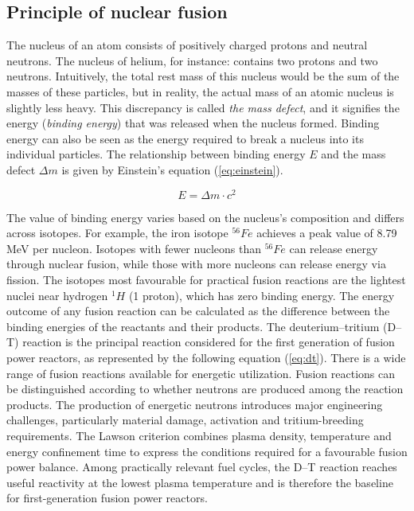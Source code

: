 \documentclass[a4paper]{article}
\begin{document}
\subsection{Principle of nuclear fusion}

The nucleus of an atom consists of positively charged protons and neutral neutrons. 
The nucleus of helium, for instance: contains two protons and two neutrons. 
Intuitively, the total rest mass of this nucleus would be the sum of the masses of these particles, but in reality, the actual mass of an atomic nucleus is slightly less heavy.
This discrepancy is called \textit{the mass defect}, and it signifies the energy (\textit{binding energy}) that was released when the nucleus formed. 
Binding energy can also be seen as the energy required to break a nucleus into its individual particles. The relationship between binding energy \( E \) and the mass defect \( \Delta m \) is given by Einstein’s equation (\ref{eq:einstein}).

\begin{equation}
   E = \Delta m \cdot c^2 
\label{eq:einstein}
\end{equation}

\noindent The value of binding energy varies based on the nucleus's composition and differs across isotopes. 
For example, the iron isotope \( ^{56}Fe \) achieves a peak value of 8.79 MeV per nucleon. 
Isotopes with fewer nucleons than \( ^{56}Fe \) can release energy through nuclear fusion, while those with more nucleons can release energy via fission. 
The isotopes most favourable for practical fusion reactions are the lightest nuclei near hydrogen \( ^1H \) (1 proton), which has zero binding energy. The energy outcome of any fusion reaction can be calculated as the difference between the binding energies of the reactants and their products. 
The deuterium--tritium (D--T) reaction is the principal reaction considered for the first generation of fusion power reactors, as represented by the following equation (\ref{eq:dt}).
There is a wide range of fusion reactions available for energetic utilization. 
Fusion reactions can be distinguished according to whether neutrons are produced among the reaction products. 
The production of energetic neutrons introduces major engineering challenges, particularly material damage, activation and tritium-breeding requirements. 
The Lawson criterion combines plasma density, temperature and energy confinement time to express the conditions required for a favourable fusion power balance.
Among practically relevant fuel cycles, the D--T reaction reaches useful reactivity at the lowest plasma temperature and is therefore the baseline for first-generation fusion power reactors.
\end{document}
